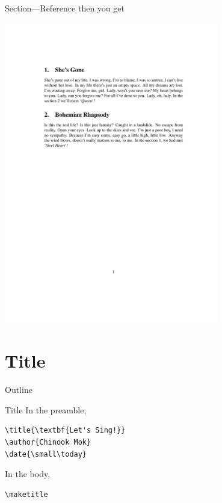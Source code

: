 \documentclass[12pt]{gshs_lecture}
\begin{document}
\begin{frame}[t]{Section---Reference}\small
then you get
\begin{center}
\begin{framed}
\includegraphics[width=0.7\textwidth,trim={0cm 16cm 0cm 4cm},clip]{./test_article/article006.pdf}
\end{framed}
\end{center}
\end{frame}

\section{Title} %

\begin{frame}[t]{Outline}
\tableofcontents[currentsection]
\end{frame}

\begin{frame}[t,fragile]{Title}\small
In the preamble,
\begin{block}{}
\begin{lstlisting}
\title{\textbf{Let's Sing!}}
\author{Chinook Mok}
\date{\small\today}
\end{lstlisting}
\end{block}
In the body,
\begin{block}{}
\begin{lstlisting}
\maketitle
\end{lstlisting}
\end{block}
\end{frame}
\end{document}
